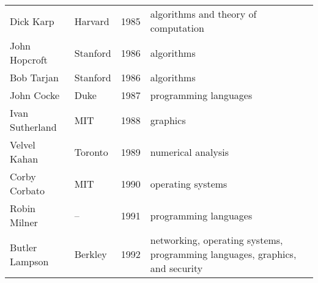 \documentclass[doublespacing]{utdthesis}
\begin{document}
\begin{table}[p]
\begin{center}
\begin{tabular}{llcp{2.5in}}
  Dick Karp & Harvard & 1985 & algorithms and theory of computation \\
  John Hopcroft & Stanford & 1986 & algorithms \\
  Bob Tarjan & Stanford & 1986 & algorithms \\
  John Cocke & Duke & 1987 & programming languages \\
  Ivan Sutherland & MIT & 1988 & graphics \\
  Velvel Kahan & Toronto & 1989 & numerical analysis \\
  Corby Corbato & MIT & 1990 & operating systems \\
  Robin Milner & -- & 1991 & programming languages \\
  Butler Lampson & Berkley & 1992 & networking, operating systems,
    programming languages, graphics, and security
  \end{tabular}
  \end{center}
\end{table}
\end{document}
